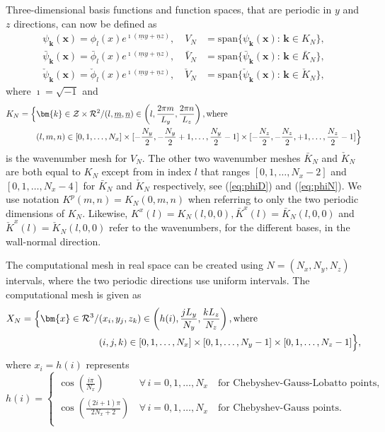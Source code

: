 \documentclass[preprint]{elsarticle}
\newcommand{\N}[1]{\check{#1}}
\newcommand{\D}[1]{\bar{#1}}
\begin{document}
Three-dimensional basis functions and function spaces, that are periodic in $y$ 
and $z$ directions, can now be defined as
\begin{align}
  \psi_{\bm{k}}(\bm{x}) = \phi_{l}(x)e^{ \imath(\underline{m} y + \underline{n} z)}, \quad V_N &= \text{span} \{ \psi_{\bm{k}}(\bm{x}):\, \bm{k} \in K_N  \}, \\
  \D{\psi}_{\bm{k}}(\bm{x}) = \D{\phi}_{l}(x)e^{ \imath(\underline{m} y + \underline{n} z)}, \quad \D{V}_N &= \text{span} \{ \D{\psi}_{\bm{k}}(\bm{x}):\, \bm{k} \in \D{K}_N  \}, \\
  \N{\psi}_{\bm{k}}(\bm{x}) = \N{\phi}_{l}(x)e^{ \imath(\underline{m} y + \underline{n} z)}, \quad \N{V}_N &= \text{span} \{ \N{\psi}_{\bm{k}}(\bm{x}):\, \bm{k} \in \N{K}_N  \},
\end{align}
where $\imath=\sqrt{-1}$ and 
\begin{align}
K_N = \Big\{&\bm{k} \in \mathcal{Z}\times\mathcal{R}^2 / (l, \underline{m}, \underline{n}) \in \left( l, \frac{2 \pi m}{L_y}, \frac{2 \pi n}{L_z} \right), \text{where} \notag \\
 &(l, m, n) \in  [0,1, \ldots, N_x] \times  [-\frac{N_y}{2},-\frac{N_y}{2}+1,\ldots, 
 \frac{N_y}{2}-1] \times [-\frac{N_z}{2},-\frac{N_z}{2},+1,\ldots, \frac{N_z}{2}-1] \Big\} 
 \label{eq:wavenumbermesh}
\end{align}
is the wavenumber mesh for $V_N$. The other two wavenumber meshes $\D{K}_N$ and 
$\N{K}_N$ are both equal to $K_N$ except from in index $l$ that 
ranges $[0, 1, \ldots, N_x-2]$ and $[0, 1, \ldots, N_x-4]$ for $\D{K}_N$ 
and $\N{K}_N$ respectively, see (\ref{eq:phiD}) and (\ref{eq:phiN}). We use 
notation $K^p(m, n)=K_N(0, m, n)$ when referring to only the two periodic 
dimensions of $K_N$. Likewise, ${K}^x(l)={K}_N(l, 0, 0), \D{K}^x(l)=\D{K}_N(l, 0, 0)$ and $\N{K}^x(l)=\N{K}_N(l, 0, 0)$ refer to the wavenumbers, for the different bases, in the wall-normal direction.

The computational mesh in real space can be created using $N = (N_x, N_y, 
N_z)$ intervals, where the two periodic directions use uniform intervals. The 
computational mesh is given as
\begin{align}
  X_N = \Big\{ \bm{x} \in \mathcal{R}^3/&(x_i, y_j, z_k) \in \left( h(i), \frac{jL_y}{N_y}, \frac{kL_z}{N_z} \right), \text{where} \notag \\
  &(i, j, k) \in [0, 1, \ldots, N_x] \times [0, 1, \ldots, N_y-1] \times [0, 1, \ldots, N_z-1] \Big\}, \label{eq:Xn}
\end{align}
where $x_i = h(i)$ represents
\begin{equation}
 h(i) = \begin{cases}
   \cos \left(\frac{i \pi }{N_x} \right) \, &\forall \, i=0,1, \ldots, N_x \quad  \text{for Chebyshev-Gauss-Lobatto points}, \\
   \cos \left(\frac{(2i +1)\pi}{2N_x+2} \right) \, &\forall \, i=0,1, \ldots, N_x \quad  \text{for Chebyshev-Gauss points}. \\
 \end{cases}
\end{equation}
\end{document}
